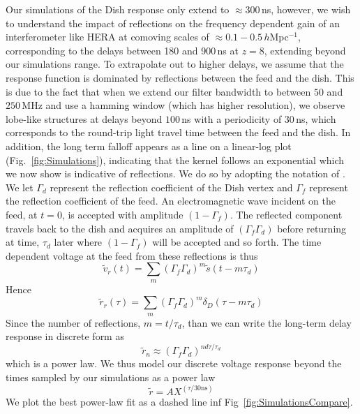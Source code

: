 \documentclass[twocolumn]{emulateapj}
\begin{document}
Our simulations of the Dish response only extend to $\approx 300$\,ns, however, we wish to understand the impact of reflections on the frequency dependent gain of an interferometer like HERA at comoving scales of $\approx 0.1-0.5$\,$h$Mpc$^{-1}$, corresponding to the delays between 180 and 900\,ns at $z=8$, extending beyond our simulations range. To extrapolate out to higher delays, we assume that the response function is dominated by reflections between the feed and the dish. This is due to the fact that when we extend our filter bandwidth to between $50$ and $250$\,MHz and use a hamming window (which has higher resolution), we observe lobe-like structures at delays beyond $100$\,ns with a periodicity of $30$\,ns, which corresponds to the round-trip light travel time between the feed and the dish.  In addition, the long term falloff appears as a line on a linear-log plot (Fig.~\ref{fig:Simulations}), indicating that the kernel follows an exponential which we now show is indicative of reflections. We do so by adopting the notation of \citep{Patra:2015}. We let $\Gamma_d$ represent the reflection coefficient of the Dish vertex and $\Gamma_f$ represent the reflection coefficient of the feed. An electromagnetic wave incident on the feed, at $t=0$, is accepted with amplitude $(1-\Gamma_f)$. The reflected component travels back to the dish and acquires an amplitude of $(\Gamma_f \Gamma_d)$ before returning at time, $\tau_d$ later where $(1-\Gamma_f)$ will be accepted and so forth. The time dependent voltage at the feed from these reflections is thus
\begin{equation}
\widetilde{v}_r(t) = \sum_m \left( \Gamma_f \Gamma_d \right)^m \widetilde{s}(t-m \tau_d)
\end{equation}
Hence
\begin{equation}
\widetilde{r}_r(\tau) = \sum_m \left( \Gamma_f \Gamma_d \right)^m \delta_D(\tau-m\tau_d)
\end{equation}
Since the number of reflections, $m=t/\tau_d$, than we can write the long-term delay response in discrete form as 
\begin{equation}
\widetilde{r}_n \approx (\Gamma_f \Gamma_d)^{n d\tau/\tau_d}
\end{equation}
which is a power law. We thus model our discrete voltage response beyond the times sampled by our simulations as a power law
\begin{equation}
\widetilde{r} = A X^{(\tau/30\text{ns})} 
\end{equation}
We plot the best power-law fit as a dashed line inf Fig~\ref{fig:SimulationsCompare}.
\end{document}
